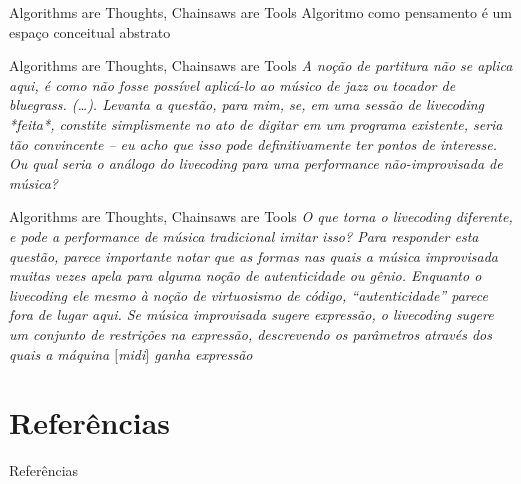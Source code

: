 \documentclass[aspectratio=169]{beamer}
\begin{document}
\begin{frame}{Algorithms are Thoughts, Chainsaws are Tools}
Algoritmo como pensamento é um espaço conceitual abstrato
\end{frame}

\begin{frame}{Algorithms are Thoughts, Chainsaws are Tools}
\emph{A noção de partitura não se aplica aqui, é como não fosse possível aplicá-lo ao músico de \emph{jazz} ou tocador de \emph{bluegrass}. (\ldots). Levanta a questão, para mim, se, em uma sessão de \emph{livecoding} *feita*, constite simplismente no ato de digitar em um programa existente, seria tão convincente -- eu acho que isso pode definitivamente ter pontos de interesse. Ou qual seria o análogo do \emph{livecoding} para uma performance não-improvisada de música?}
\end{frame}

\begin{frame}{Algorithms are Thoughts, Chainsaws are Tools}
\emph{O que torna o \emph{livecoding} diferente, e pode a performance de música tradicional imitar isso? Para responder esta questão, parece importante notar que as formas nas quais a música improvisada muitas vezes apela para alguma noção de autenticidade ou gênio. Enquanto o \emph{livecoding} ele mesmo à noção de virtuosismo de código, ``autenticidade'' parece fora de lugar aqui. Se música improvisada sugere expressão, o \emph{livecoding} sugere um conjunto de restrições na expressão, descrevendo os parâmetros através dos quais a máquina $[$midi$]$ ganha expressão}
\end{frame}
\section*{Referências}


\begin{frame}[allowframebreaks]{Referências}

\end{frame}

\end{document}
